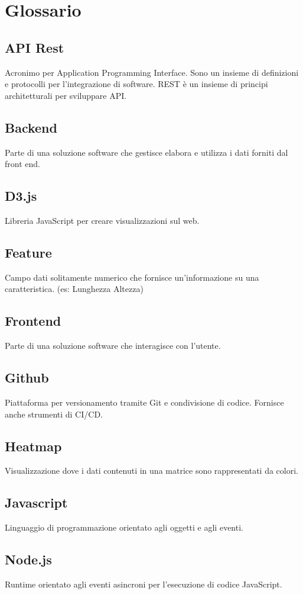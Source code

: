 \section{Glossario}    
    \subsection{API Rest}
    Acronimo per Application Programming Interface. Sono un insieme di definizioni e protocolli
    per l’integrazione di software. REST è un insieme di principi architetturali per sviluppare API.
    \subsection{Backend}
    Parte di una soluzione software che gestisce elabora e utilizza i dati forniti dal front end.
    \subsection{D3.js}
    Libreria JavaScript per creare visualizzazioni sul web.
    \subsection{Feature}
    Campo dati solitamente numerico che fornisce un’informazione su una caratteristica. (es: Lunghezza Altezza)
    \subsection{Frontend}
    Parte di una soluzione software che interagisce con l’utente.
    \subsection{Github}
    Piattaforma per versionamento tramite Git e condivisione di codice. Fornisce anche strumenti
    di CI/CD.
    \subsection{Heatmap}
    Visualizzazione dove i dati contenuti in una matrice sono rappresentati da colori.
    \subsection{Javascript}
    Linguaggio di programmazione orientato agli oggetti e agli eventi.
    \subsection{Node.js}
    Runtime orientato agli eventi asincroni per l’esecuzione di codice JavaScript.
